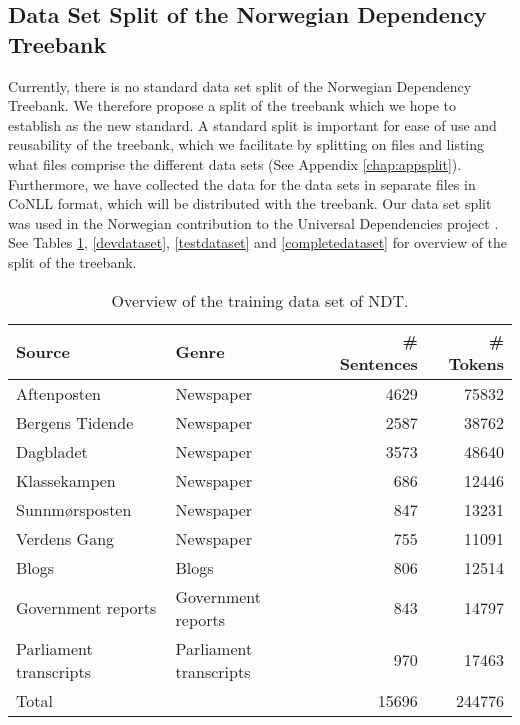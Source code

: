 \documentclass[a4paper,12pt,english]{book}
\begin{document}
\subsection{Data Set Split of the Norwegian Dependency Treebank}
Currently, there is no standard data set split of the Norwegian Dependency
Treebank. We therefore propose a split of the treebank which we hope to
establish as the new standard. A standard split is important for ease of use
and reusability of the treebank, which we facilitate by splitting on files and
listing what files comprise the different data sets (See Appendix
\ref{chap:appsplit}).  Furthermore, we have collected the data for the data
sets in separate files in CoNLL format, which will be distributed with the
treebank. Our data set split was used in the Norwegian contribution to the
Universal Dependencies project \cite{Ovr:Hoh:16}. See Tables
\ref{trainingdataset}, \ref{devdataset}, \ref{testdataset} and
\ref{completedataset} for overview of the split of the treebank.

\begin{table}
    \centering
    \smaller[0.5]
    \begin{tabular}{@{}llrr@{}}
        \toprule
        \textbf{Source} & \textbf{Genre} & \textbf{\# Sentences} &
        \textbf{\# Tokens} \\
        \midrule
        Aftenposten & Newspaper & 4629 & 75832 \\
        Bergens Tidende & Newspaper & 2587 & 38762 \\
        Dagbladet & Newspaper & 3573 & 48640 \\
        Klassekampen & Newspaper & 686 & 12446 \\
        Sunnmørsposten & Newspaper & 847 & 13231 \\
        Verdens Gang & Newspaper & 755 & 11091 \\
        Blogs & Blogs & 806 & 12514 \\
        Government reports & Government reports & 843 & 14797 \\
        Parliament transcripts & Parliament transcripts & 970 & 17463 \\
        \midrule
        Total & & 15696 & 244776 \\
        \bottomrule
    \end{tabular}
    \caption{Overview of the training data set of NDT.}
    \label{trainingdataset}
\end{table}
\end{document}
